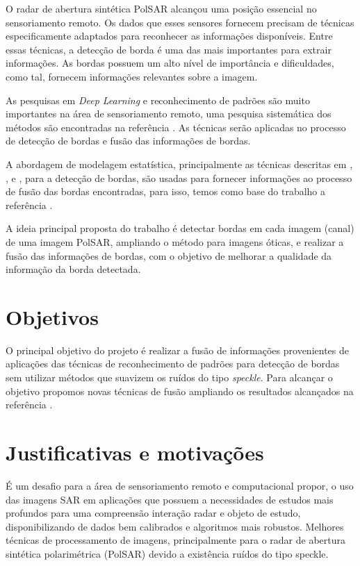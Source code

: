 \documentclass[runningheads]{llncs}
\begin{document}
O radar de abertura sintética PolSAR alcançou uma posição essencial no sensoriamento remoto. Os dados que esses sensores fornecem precisam de técnicas especificamente adaptados para reconhecer as informações disponíveis. Entre essas técnicas, a detecção de borda é uma das mais importantes para extrair informações. As bordas possuem um alto nível de importância e dificuldades, como tal, fornecem informações relevantes sobre a imagem.

As pesquisas em \textit{Deep Learning} e reconhecimento de padrões são muito importantes na área de sensoriamento remoto, uma pesquisa sistemática dos métodos são encontradas na referência \cite{ztmxzxf}. 
As técnicas serão aplicadas no processo de detecção de bordas e fusão das informações de bordas. 

A abordagem de modelagem estatística, principalmente as técnicas descritas em \cite{bmf_2020}, \cite{nhfc},  e \cite{ref_proc3}, para a detecção de bordas, são usadas para fornecer informações ao processo de fusão das bordas encontradas, para isso, temos como base do trabalho a referência \cite{ref_proc4}. 

A ideia principal proposta do trabalho é detectar bordas em cada imagem (canal) de uma imagem PolSAR, ampliando o método para imagens óticas, e realizar a fusão das informações de bordas, com o objetivo de melhorar a qualidade da informação da borda detectada.

\section{Objetivos}

O principal objetivo do projeto é realizar a fusão de informações provenientes de aplicações das técnicas de reconhecimento de padrões para detecção de bordas sem utilizar métodos que suavizem os ruídos do tipo \textit{speckle}. Para alcançar o objetivo propomos novas técnicas de fusão ampliando os resultados alcançados na referência \cite{bmf_2020}.

\section{Justificativas e motivações}

É um desafio para a área de sensoriamento remoto e computacional propor, o uso das imagens SAR em aplicações que possuem a necessidades de estudos mais profundos para uma compreensão interação radar e objeto de estudo, disponibilizando de dados bem calibrados e algoritmos mais robustos. Melhores técnicas de processamento de imagens, principalmente para o radar de abertura sintética polarimétrica (PolSAR) devido a existência ruídos do tipo speckle.
\end{document}
